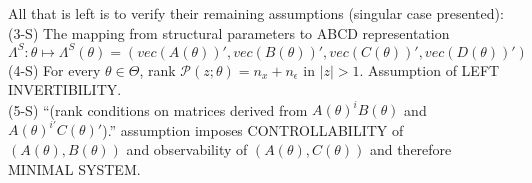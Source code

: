 \documentclass[10pt]{article}
\numberwithin{equation}{section}
\theoremstyle{definition}
\theoremstyle{remark}
\begin{document}
All that is left is to verify their remaining assumptions (singular case presented):\\

(3-S) The mapping from structural parameters to ABCD representation $\Lambda^S : \theta \mapsto \Lambda^S(\theta ) = (vec(A(\theta ))', vec(B(\theta ))', vec(C(\theta ))',vec(D(\theta ))')$\\

(4-S) For every $\theta \in \Theta $, rank $\mathcal{P}(z;\theta ) = n_x + n_\epsilon$ in $|z|>1$.  Assumption of LEFT INVERTIBILITY.\\

(5-S) ``(rank conditions on matrices derived from $A(\theta )^iB(\theta )$ and $A(\theta )^{i'}C(\theta )'$).''  assumption imposes CONTROLLABILITY of $(A(\theta ),B(\theta ))$ and observability of $(A(\theta ), C(\theta ))$ and therefore MINIMAL SYSTEM.


\pagebreak \appendix
\sloppy
\end{document}
